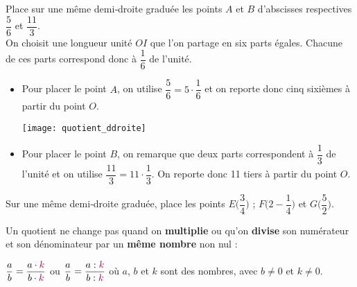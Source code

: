 \begin{methode*1}

\begin{exemple*1}
Place sur une même demi‑droite graduée les points $A$ et $B$ d'abscisses respectives $\dfrac{5}{6}$ et $\dfrac{11}{3}$. \\[1em]
On choisit une longueur unité $OI$ que l'on partage en six parts égales. Chacune de ces parts correspond donc à \textcolor{C1}{$\dfrac{1}{6}$} de l'unité.
\begin{itemize}
 \item Pour placer le point $A$, on utilise $\dfrac{5}{6} = 5 \cdot \dfrac{1}{6}$ et on reporte donc cinq \textcolor{C1}{sixièmes} à partir du point $O$.
 \begin{center} \texttt{[image: quotient\_ddroite]} \end{center}
 \item Pour placer le point $B$, on remarque que deux parts correspondent à $\dfrac{1}{3}$ de l'unité et on utilise $\dfrac{11}{3} = 11 \cdot \dfrac{1}{3}$. On reporte donc 11 tiers à partir du point $O$.
 \end{itemize}
 \end{exemple*1}
 
 
 \exercice
 Sur une même demi‑droite graduée, place les points $E \bigg(\dfrac{3}{4} \bigg)$ ; $F \bigg(2 - \dfrac{1}{4} \bigg)$ et $G \bigg(\dfrac{5}{2} \bigg)$.

 \end{methode*1}


\begin{aconnaitre}
Un quotient ne change pas quand on \textbf{multiplie} ou qu'on \textbf{\textcolor{A1}{divise}} son numérateur et son dénominateur par un \textbf{même nombre} non nul :
\begin{center} $\dfrac{a}{b} = \dfrac{a \cdot \textcolor{C1}{k}}{b \cdot \textcolor{C1}{k}}$ ou $\dfrac{a}{b} = \dfrac{a : \textcolor{C1}{k}}{b : \textcolor{C1}{k}}$ où $a$, $b$ et $k$ sont des nombres, avec $b \neq 0$ et $k \neq 0$. \end{center}
\end{aconnaitre}



